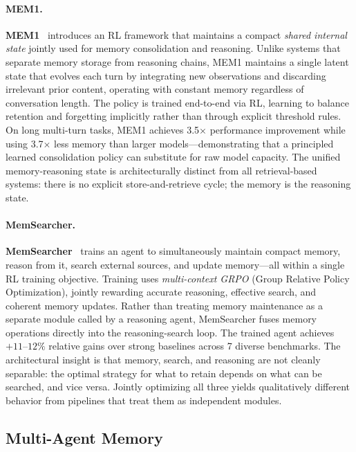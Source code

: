 \paragraph{MEM1.}
\textbf{MEM1}~\cite{mem12026} introduces an RL framework that maintains
a compact \emph{shared internal state} jointly used for memory
consolidation and reasoning.  Unlike systems that separate memory
storage from reasoning chains, MEM1 maintains a single latent state
that evolves each turn by integrating new observations and discarding
irrelevant prior content, operating with constant memory regardless of
conversation length.  The policy is trained end-to-end via RL, learning
to balance retention and forgetting implicitly rather than through
explicit threshold rules.  On long multi-turn tasks, MEM1 achieves
3.5$\times$ performance improvement while using 3.7$\times$ less memory
than larger models---demonstrating that a principled learned
consolidation policy can substitute for raw model capacity.  The
unified memory-reasoning state is architecturally distinct from all
retrieval-based systems: there is no explicit store-and-retrieve cycle;
the memory is the reasoning state.

\paragraph{MemSearcher.}
\textbf{MemSearcher}~\cite{memsearcher2025} trains an agent to
simultaneously maintain compact memory, reason from it, search external
sources, and update memory---all within a single RL training objective.
Training uses \emph{multi-context GRPO} (Group Relative Policy
Optimization), jointly rewarding accurate reasoning, effective search,
and coherent memory updates.  Rather than treating memory maintenance
as a separate module called by a reasoning agent, MemSearcher fuses
memory operations directly into the reasoning-search loop.  The trained
agent achieves $+11$--$12\%$ relative gains over strong baselines
across 7 diverse benchmarks.  The architectural insight is that memory,
search, and reasoning are not cleanly separable: the optimal strategy
for what to retain depends on what can be searched, and vice versa.
Jointly optimizing all three yields qualitatively different behavior
from pipelines that treat them as independent modules.

\subsection{Multi-Agent Memory}
\label{sec:multiagent-memory}


